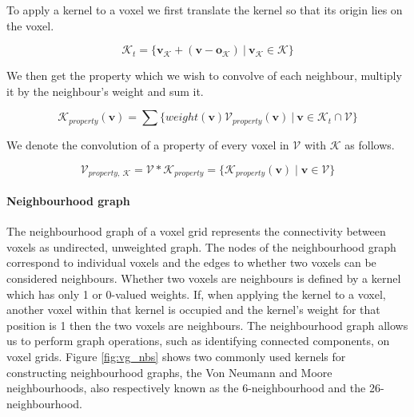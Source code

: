 To apply a kernel to a voxel we first translate the kernel so that its origin lies on the voxel.

\begin{equation}
    \label{eq:kv}
\mathcal{K}_t = \{\boldsymbol{v_{\mathcal{K}}} + (\boldsymbol{v} - \boldsymbol{o_{\mathcal{K}}})\ |\ \boldsymbol{v_{\mathcal{K}}} \in \mathcal{K}\}
\end{equation}

We then get the property which we wish to convolve of each neighbour, multiply it by the neighbour's weight and sum it.

\begin{equation}
    \label{eq:kw}
    \mathcal{K}_{property}(\boldsymbol{v}) = \sum \{weight(\boldsymbol{v})\mathcal{V}_{property}(\boldsymbol{v})\ |\ \boldsymbol{v} \in \mathcal{K}_{t} \cap \mathcal{V}\}
\end{equation}

We denote the convolution of a property of every voxel in \(\mathcal{V}\) with \(\mathcal{K}\) as follows.

\begin{equation}
    \label{eq:c}
    \mathcal{V}_{property,\  \mathcal{K}} = \mathcal{V} * \mathcal{K}_{property} = \{\mathcal{K}_{property}(\boldsymbol{v}) \mid \boldsymbol{v} \in \mathcal{V}\}
\end{equation}


\paragraph{Neighbourhood graph}

The neighbourhood graph of a voxel grid represents the connectivity between voxels as undirected, unweighted graph. The nodes of the neighbourhood graph correspond to individual voxels and the edges to whether two voxels can be considered neighbours. Whether two voxels are neighbours is defined by a kernel which has only 1 or 0-valued weights. If, when applying the kernel to a voxel, another voxel within that kernel is occupied and the kernel's weight for that position is 1 then the two voxels are neighbours. The neighbourhood graph allows us to perform graph operations, such as identifying connected components, on voxel grids. Figure \ref{fig:vg_nbs} shows two commonly used kernels for constructing neighbourhood graphs, the Von Neumann and Moore neighbourhoods, also respectively known as the 6-neighbourhood and the 26-neighbourhood.

